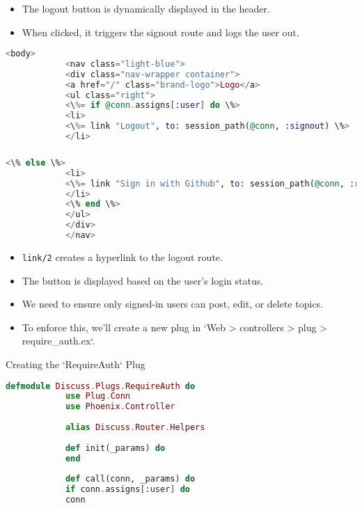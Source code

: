 \documentclass[aspectratio=169, table]{beamer}
\begin{document}
	\begin{frame}[fragile]
		\frametitle{}
		\begin{itemize}
			\item The logout button is dynamically displayed in the header.
			\item When clicked, it triggers the signout route and logs the user out.
		\end{itemize}
		\begin{lstlisting}[language=Elixir]
			<body>
			<nav class="light-blue">
			<div class="nav-wrapper container">
			<a href="/" class="brand-logo">Logo</a>
			<ul class="right">
			<\%= if @conn.assigns[:user] do \%>
			<li>
			<\%= link "Logout", to: session_path(@conn, :signout) \%>
			</li>
		\end{lstlisting}
	\end{frame}
	
	\begin{frame}[fragile]
		\frametitle{}
		\begin{lstlisting}[language=Elixir]
			<\% else \%>
			<li>
			<\%= link "Sign in with Github", to: session_path(@conn, :request, "github") \%>
			</li>
			<\% end \%>
			</ul>
			</div>
			</nav>
		\end{lstlisting}
		\begin{itemize}
			\item \texttt{link/2} creates a hyperlink to the logout route.
			\item The button is displayed based on the user's login status.
		\end{itemize}
	\end{frame}
	
	\begin{frame}{}
		\begin{itemize}
			\item We need to ensure only signed-in users can post, edit, or delete topics.
			\item To enforce this, we'll create a new plug in `Web > controllers > plug > require\_auth.ex`.
		\end{itemize}
	\end{frame}
	
	\begin{frame}[fragile]{Creating the `RequireAuth` Plug}
		\begin{lstlisting}[language=Elixir]
			defmodule Discuss.Plugs.RequireAuth do
			use Plug.Conn
			use Phoenix.Controller
			
			alias Discuss.Router.Helpers
			
			def init(_params) do
			end
			
			def call(conn, _params) do
			if conn.assigns[:user] do
			conn
		\end{lstlisting}
	\end{frame}
	
\end{document}
